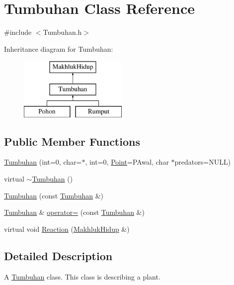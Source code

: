 \hypertarget{class_tumbuhan}{}\section{Tumbuhan Class Reference}
\label{class_tumbuhan}


{\ttfamily \#include $<$Tumbuhan.\+h$>$}

Inheritance diagram for Tumbuhan\+:\begin{figure}[H]
\begin{center}
\leavevmode
\includegraphics[height=3.000000cm]{class_tumbuhan}
\end{center}
\end{figure}
\subsection*{Public Member Functions}
\begin{DoxyCompactItemize}
\item 
\hyperlink{class_tumbuhan_aece859d46878b8a73ac6d9fd289be394}{Tumbuhan} (int=0, char=\textquotesingle{}$\ast$\textquotesingle{}, int=0, \hyperlink{class_point}{Point}=P\+Awal, char $\ast$predators=N\+U\+LL)
\item 
virtual \hyperlink{class_tumbuhan_a2a100d72f16d993c8ee8f60dedecde9f}{$\sim$\+Tumbuhan} ()
\item 
\hyperlink{class_tumbuhan_a1bbb9c53833295124b77b21b10f2381f}{Tumbuhan} (const \hyperlink{class_tumbuhan}{Tumbuhan} \&)
\item 
\hyperlink{class_tumbuhan}{Tumbuhan} \& \hyperlink{class_tumbuhan_afc48425284c108828af78310674ebf4b}{operator=} (const \hyperlink{class_tumbuhan}{Tumbuhan} \&)
\item 
virtual void \hyperlink{class_tumbuhan_aa4cdb9c1bf7aebe6f35a9292b4d527e1}{Reaction} (\hyperlink{class_makhluk_hidup}{Makhluk\+Hidup} \&)
\end{DoxyCompactItemize}


\subsection{Detailed Description}
A \hyperlink{class_tumbuhan}{Tumbuhan} class. This class is describing a plant. 

